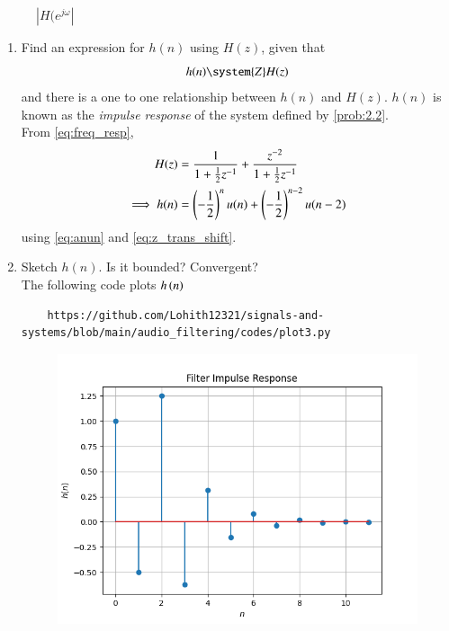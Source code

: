 \documentclass[journal,12pt,twocolumn]{IEEEtran}
\theoremstyle{remark}
\begin{document}
\begin{enumerate}[label=\thesection.\arabic*
,ref=\thesection.\theenumi]
\begin{enumerate}[label=\thesection.\arabic*
,ref=\thesection.\theenumi]
\begin{figure}[ht]
\begin{center}
    \caption{$|H(e^{j\omega}|$}
\end{center}
    
    \label{fig:}
\end{figure}
\begin{enumerate}[label=\thesection.\arabic*
,ref=\thesection.\theenumi]
\section{Impulsive Response}
\item \label{prob:impulse_resp}
Find an expression for $h(n)$ using $H(z)$, given that 
\begin{equation}
\label{eq:impulse_resp}
h(n) \system{Z} H(z)
\end{equation}
and there is a one to one relationship between $h(n)$ and $H(z)$. $h(n)$ is known as the {\em impulse response} of the
system defined by \eqref{prob:2.2}.
\\
\solution From \eqref{eq:freq_resp},
\begin{align}
H(z) &= \frac{1}{1 + \frac{1}{2}z^{-1}} + \frac{ z^{-2}}{1 + \frac{1}{2}z^{-1}}
\\
\implies h(n) &= \left(-\frac{1}{2}\right)^{n}u(n) + \left(-\frac{1}{2}\right)^{n-2}u(n-2)
\end{align}
using \eqref{eq:anun} and \eqref{eq:z_trans_shift}.
\item Sketch $h(n)$. Is it bounded? Convergent? \\
\solution The following code plots $h\left(n\right)$ 
\begin{lstlisting}
    https://github.com/Lohith12321/signals-and-systems/blob/main/audio_filtering/codes/plot3.py
\end{lstlisting}
\begin{figure}[ht]
    \centering  
\includegraphics[width=\columnwidth]{figs/plot3.png}

\end{figure}
\end{enumerate}
\end{enumerate}
\end{enumerate}
\end{document}
